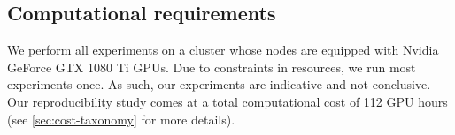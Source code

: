 \subsection{Computational requirements}

We perform all experiments on a cluster whose nodes are equipped with Nvidia GeForce GTX 1080 Ti GPUs. 
Due to constraints in resources, we run most experiments once. As such, our experiments are indicative and not conclusive. Our reproducibility study comes at a total computational cost of 112 GPU hours (see \cref{sec:cost-taxonomy} for more details).


